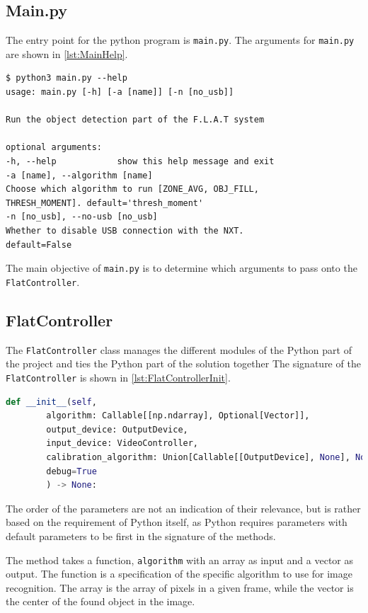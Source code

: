 \subsection{Main.py}
The entry point for the python program is \texttt{main.py}.
The arguments for \texttt{main.py}  are shown in \autoref{lst:MainHelp}.
\begin{lstlisting}[label={lst:MainHelp},caption={The help message of the commandline interface}]
$ python3 main.py --help
usage: main.py [-h] [-a [name]] [-n [no_usb]]

Run the object detection part of the F.L.A.T system

optional arguments:
-h, --help            show this help message and exit
-a [name], --algorithm [name]
Choose which algorithm to run [ZONE_AVG, OBJ_FILL,
THRESH_MOMENT]. default='thresh_moment'
-n [no_usb], --no-usb [no_usb]
Whether to disable USB connection with the NXT.
default=False
\end{lstlisting}

The main objective of \texttt{main.py} is to determine which arguments to pass onto the \texttt{FlatController}.

\subsection{FlatController}\label{flatcontrollerimplementation}
The \texttt{FlatController} class manages the different modules of the Python part of the project and ties the Python part of the solution together
The signature of the \texttt{FlatController} is shown in \autoref{lst:FlatControllerInit}.

\begin{lstlisting}[language=Python,label={lst:FlatControllerInit},caption={Initialization method of the \texttt{FlatController} class}]
	def __init__(self,
		algorithm: Callable[[np.ndarray], Optional[Vector]],
		output_device: OutputDevice,
		input_device: VideoController,
		calibration_algorithm: Union[Callable[[OutputDevice], None], None] = None,
		debug=True
		) -> None:
\end{lstlisting}

The order of the parameters are not an indication of their relevance, but is rather based on the requirement of Python itself, as Python requires parameters with default parameters to be first in the signature of the methods.

The method takes a function, \texttt{algorithm} with an array as input and a vector as output.
The function is a specification of the specific algorithm to use for image recognition.
The array is the array of pixels in a given frame, while the vector is the center of the found object in the image.

